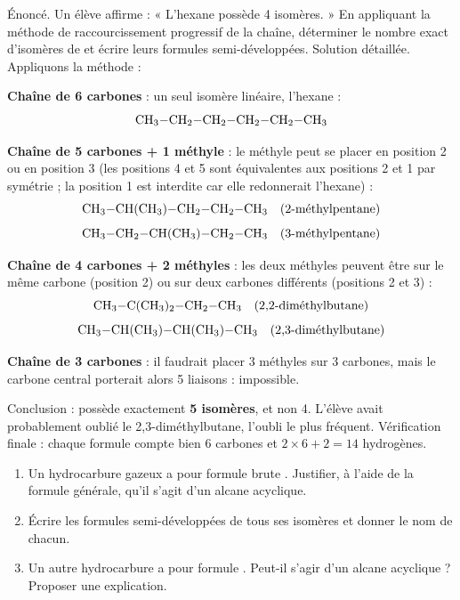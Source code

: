 \documentclass[11pt]{article}
\begin{document}
\begin{exoresolu}
Énoncé. Un élève affirme : « L'hexane  possède 4 isomères. » En appliquant la méthode de raccourcissement progressif de la chaîne, déterminer le nombre exact d'isomères de  et écrire leurs formules semi-développées.
\tcblower
Solution détaillée. Appliquons la méthode :

\textbf{Chaîne de 6 carbones} : un seul isomère linéaire, l'hexane :
\[ \ce{CH3-CH2-CH2-CH2-CH2-CH3} \]

\textbf{Chaîne de 5 carbones + 1 méthyle} : le méthyle peut se placer en position 2 ou en position 3 (les positions 4 et 5 sont équivalentes aux positions 2 et 1 par symétrie ; la position 1 est interdite car elle redonnerait l'hexane) :
\[ \ce{CH3-CH(CH3)-CH2-CH2-CH3} \quad \text{(2-méthylpentane)} \]
\[ \ce{CH3-CH2-CH(CH3)-CH2-CH3} \quad \text{(3-méthylpentane)} \]

\textbf{Chaîne de 4 carbones + 2 méthyles} : les deux méthyles peuvent être sur le même carbone (position 2) ou sur deux carbones différents (positions 2 et 3) :
\[ \ce{CH3-C(CH3)2-CH2-CH3} \quad \text{(2,2-diméthylbutane)} \]
\[ \ce{CH3-CH(CH3)-CH(CH3)-CH3} \quad \text{(2,3-diméthylbutane)} \]

\textbf{Chaîne de 3 carbones} : il faudrait placer 3 méthyles sur 3 carbones, mais le carbone central porterait alors 5 liaisons : impossible.

Conclusion :  possède exactement \textbf{5 isomères}, et non 4. L'élève avait probablement oublié le 2,3-diméthylbutane, l'oubli le plus fréquent. Vérification finale : chaque formule compte bien 6 carbones et $2 \times 6 + 2 = 14$ hydrogènes.
\end{exoresolu}

\begin{exercice}
\begin{enumerate}
\item Un hydrocarbure gazeux a pour formule brute . Justifier, à l'aide de la formule générale, qu'il s'agit d'un alcane acyclique.
\item Écrire les formules semi-développées de tous ses isomères et donner le nom de chacun.
\item Un autre hydrocarbure a pour formule . Peut-il s'agir d'un alcane acyclique ? Proposer une explication.
\end{enumerate}
\end{exercice}
\end{document}
